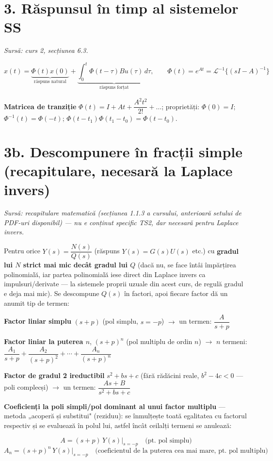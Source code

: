 \documentclass[10pt,a4paper]{article}
\newcommand{\srcnote}[1]{{\footnotesize\color{gray!55!black}\textit{Sursă: #1}}\par}
\begin{document}
\section*{3. Răspunsul în timp al sistemelor SS}\label{sec:3}
\srcnote{curs 2, secțiunea 6.3.}
\begin{keyeq}\color{red!65!black}
$$x(t)=\underbrace{\Phi(t)x(0)}_{\text{răspuns natural}}+\underbrace{\int_0^t\Phi(t-\tau)Bu(\tau)\,d\tau}_{\text{răspuns forțat}},\qquad \Phi(t)=e^{At}=\mathcal{L}^{-1}\{(sI-A)^{-1}\}$$
\end{keyeq}
\textbf{Matricea de tranziție} $\Phi(t)=I+At+\dfrac{A^2t^2}{2!}+\dots$; proprietăți: $\Phi(0)=I$; $\Phi^{-1}(t)=\Phi(-t)$; $\Phi(t-t_1)\Phi(t_1-t_0)=\Phi(t-t_0)$.

\section*{3b. Descompunere în fracții simple (recapitulare, necesară la Laplace invers)}\label{sec:3b}
\srcnote{recapitulare matematică (secțiunea 1.1.3 a cursului, anterioară setului de PDF-uri disponibil) — nu e conținut specific TS2, dar necesară pentru Laplace invers.}
Pentru orice $Y(s)=\dfrac{N(s)}{Q(s)}$ (răspuns $Y(s){=}G(s)U(s)$ etc.) cu \textbf{gradul lui $N$ strict mai mic decât gradul lui $Q$} (dacă nu, se face întâi împărțirea polinomială, iar partea polinomială iese direct din Laplace invers ca impulsuri/derivate — la sistemele proprii uzuale din acest curs, de regulă gradul e deja mai mic). Se descompune $Q(s)$ în factori, apoi fiecare factor dă un anumit tip de termen:
\begin{keyeq}\color{red!65!black}
\textbf{Factor liniar simplu} $(s{+}p)$ (pol simplu, $s{=}{-}p$) $\to$ un termen: $\dfrac{A}{s+p}$

\textbf{Factor liniar la puterea $n$}, $(s{+}p)^n$ (pol multiplu de ordin $n$) $\to$ $n$ termeni: $\dfrac{A_1}{s+p}+\dfrac{A_2}{(s+p)^2}+\cdots+\dfrac{A_n}{(s+p)^n}$

\textbf{Factor de gradul 2 ireductibil} $s^2{+}bs{+}c$ (fără rădăcini reale, $b^2{-}4c<0$ — poli complecși) $\to$ un termen: $\dfrac{As+B}{s^2+bs+c}$
\end{keyeq}
\textbf{Coeficienți la poli simpli/pol dominant al unui factor multiplu} — metoda „acoperă și substitui" (reziduu): se înmulțește toată egalitatea cu factorul respectiv și se evaluează în polul lui, astfel încât ceilalți termeni se anulează:
\begin{keyeq}\color{red!65!black}
$$A=(s+p)\,Y(s)\Big|_{s=-p}\quad\text{(pt. pol simplu)}$$
$$A_n=(s+p)^n\,Y(s)\Big|_{s=-p}\quad\text{(coeficientul de la puterea cea mai mare, pt. pol multiplu)}$$
\end{keyeq}
\end{document}
